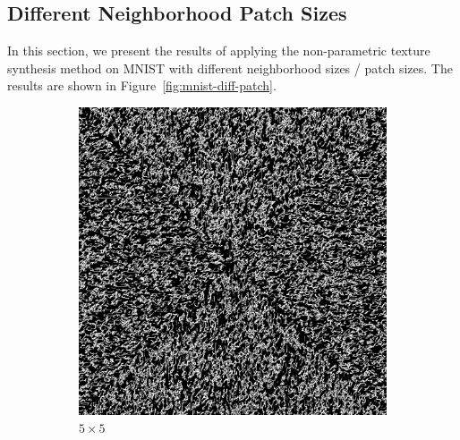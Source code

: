 \documentclass{article}
\begin{document}
\subsection{Different Neighborhood Patch Sizes}
In this section, we present the results of applying the non-parametric texture synthesis method on MNIST with different neighborhood sizes / patch sizes.
The results are shown in Figure~\ref{fig:mnist-diff-patch}.

\begin{figure}
    \centering
    \begin{subfigure}{0.45\textwidth}
        \centering
        \includegraphics[width=\linewidth]{../Result/mnist-patch-5.png}
        \caption{$5 \times 5$}
        \label{fig:mnist-patch-5}
    \end{subfigure}
    \begin{subfigure}{0.45\textwidth}
        \centering

\end{subfigure}
\end{figure}
\end{document}
